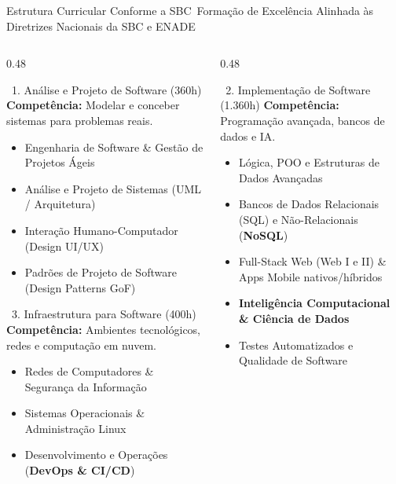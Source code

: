 
\begin{frame}{Estrutura Curricular Conforme a SBC}{\faCubes\ Formação de Excelência Alinhada às Diretrizes Nacionais da SBC e ENADE}
  \begin{columns}[t]
    \begin{column}{0.48\textwidth}
      \begin{bluecard}{\faProjectDiagram\ 1. Análise e Projeto de Software (360h)}
        \tiny
        \textbf{Competência:} Modelar e conceber sistemas para problemas reais.
        \begin{itemize}\setlength{\itemsep}{0.05em}
          \item Engenharia de Software \& Gestão de Projetos Ágeis
          \item Análise e Projeto de Sistemas (UML / Arquitetura)
          \item Interação Humano-Computador (Design UI/UX)
          \item Padrões de Projeto de Software (Design Patterns GoF)
        \end{itemize}
      \end{bluecard}
      
      \vspace{0.1cm}
      
      \begin{greencard}{\faServer\ 3. Infraestrutura para Software (400h)}
        \tiny
        \textbf{Competência:} Ambientes tecnológicos, redes e computação em nuvem.
        \begin{itemize}\setlength{\itemsep}{0.05em}
          \item Redes de Computadores \& Segurança da Informação
          \item Sistemas Operacionais \& Administração Linux
          \item Desenvolvimento e Operações (\textbf{DevOps \& CI/CD})
        \end{itemize}
      \end{greencard}
    \end{column}
    
    \begin{column}{0.48\textwidth}
      \begin{purplecard}{\faCode\ 2. Implementação de Software (1.360h)}
        \tiny
        \textbf{Competência:} Programação avançada, bancos de dados e IA.
        \begin{itemize}\setlength{\itemsep}{0.05em}
          \item Lógica, POO e Estruturas de Dados Avançadas
          \item Bancos de Dados Relacionais (SQL) e Não-Relacionais (\textbf{NoSQL})
          \item Full-Stack Web (Web I e II) \& Apps Mobile nativos/híbridos
          \item \textbf{Inteligência Computacional \& Ciência de Dados}
          \item Testes Automatizados e Qualidade de Software
        \end{itemize}
      \end{purplecard}
      

\end{column}
\end{columns}
\end{frame}
